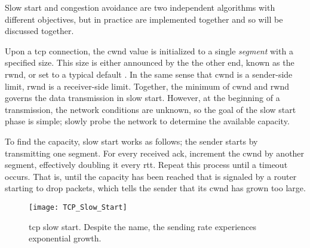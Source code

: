 




Slow start and congestion avoidance are two independent algorithms with
different objectives, but in practice are implemented together and so will be discussed together.

Upon a \gls{tcp} connection, the \gls{cwnd} value is initialized to a single \textit{segment} with a specified size. This size is either  announced by the the other end, known as the \gls{rwnd}, or set to a typical default \cite{rfc5681}. In the same sense that \gls{cwnd} is a sender-side limit, \gls{rwnd} is a receiver-side limit. Together, the minimum of \gls{cwnd} and \gls{rwnd} governs the data transmission in slow start. However, at the beginning of a transmission, the network conditions are unknown, so the goal of the slow start phase is simple; slowly probe the network to determine the available capacity.

To find the capacity, slow start works as follows; the sender starts by transmitting one segment. For every received \gls{ack}, increment the \gls{cwnd} by another segment, effectively doubling it every \gls{rtt}. Repeat this process until a timeout occurs. That is, until the capacity has been reached that is signaled by a router starting to drop packets, which tells the sender that its \gls{cwnd} has grown too large.

\begin{figure}[H]
    \centering
    \texttt{[image: TCP\_Slow\_Start]}
    \captionsetup{width=0.4\textwidth}
    \caption{\gls{tcp} slow start. Despite the name, the sending rate experiences exponential growth. }
\end{figure}


